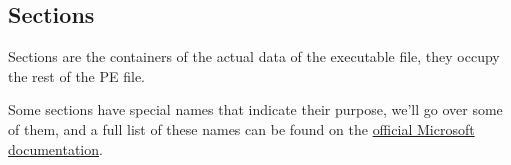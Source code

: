 \subsection{Sections}

Sections are the containers of the actual data of the executable file, they occupy the rest of the PE file.

Some sections have special names that indicate their purpose, we’ll go over some of them, and a full list of these names can be found on the \href{https://learn.microsoft.com/en-us/windows/win32/debug/pe-format#special-sections}{official Microsoft documentation}.


